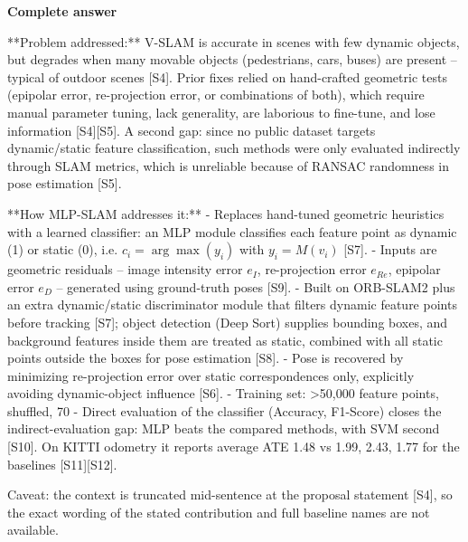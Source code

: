 \documentclass[10pt]{article}
\begin{document}
\textbf{Complete answer}
\begin{AnswerText}
**Problem addressed:** V-SLAM is accurate in scenes with few dynamic objects, but degrades when many movable objects (pedestrians, cars, buses) are present -- typical of outdoor scenes [S4]. Prior fixes relied on hand-crafted geometric tests (epipolar error, re-projection error, or combinations of both), which require manual parameter tuning, lack generality, are laborious to fine-tune, and lose information [S4][S5]. A second gap: since no public dataset targets dynamic/static feature classification, such methods were only evaluated indirectly through SLAM metrics, which is unreliable because of RANSAC randomness in pose estimation [S5].

**How MLP-SLAM addresses it:**
- Replaces hand-tuned geometric heuristics with a learned classifier: an MLP module classifies each feature point as dynamic (1) or static (0), i.e. $c_i = \arg\max(y_i)$ with $y_i = M(v_i)$ [S7].
- Inputs are geometric residuals -- image intensity error $e_I$, re-projection error $e_{Re}$, epipolar error $e_D$ -- generated using ground-truth poses [S9].
- Built on ORB-SLAM2 plus an extra dynamic/static discriminator module that filters dynamic feature points before tracking [S7]; object detection (Deep Sort) supplies bounding boxes, and background features inside them are treated as static, combined with all static points outside the boxes for pose estimation [S8].
- Pose is recovered by minimizing re-projection error over static correspondences only, explicitly avoiding dynamic-object influence [S6].
- Training set: >50,000 feature points, shuffled, 70%
- Direct evaluation of the classifier (Accuracy, F1-Score) closes the indirect-evaluation gap: MLP beats the compared methods, with SVM second [S10]. On KITTI odometry it reports average ATE 1.48 vs 1.99, 2.43, 1.77 for the baselines [S11][S12].

Caveat: the context is truncated mid-sentence at the proposal statement [S4], so the exact wording of the stated contribution and full baseline names are not available.
\end{AnswerText}
\end{document}

